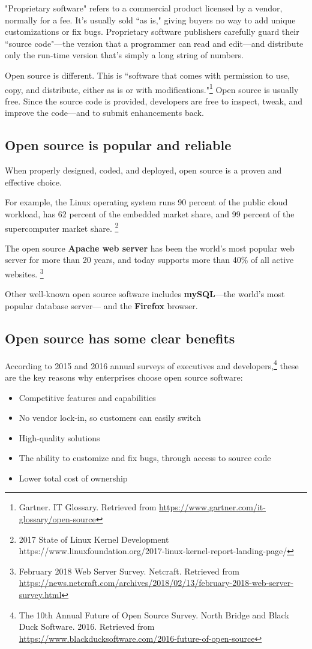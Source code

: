 "Proprietary software" refers to a commercial product licensed by a vendor, normally for a fee. It's usually sold ``as is," giving buyers no way to add unique customizations or fix bugs. Proprietary software publishers carefully guard their ``source code"---the version that a programmer can read and edit---and distribute only the run-time version that's simply a long string of numbers. 

Open source is different. This is ``software that comes with permission to use, copy, and distribute, either as is or with modifications."\footnote{ Gartner. IT Glossary. Retrieved from \url{https://www.gartner.com/it-glossary/open-source}} Open source is usually free. Since the source code is  provided, developers are free to inspect, tweak, and improve the code---and to submit enhancements back. 

\subsection{Open source is popular and reliable}
When properly designed, coded, and deployed, open source is a proven and effective choice. 

For example, the Linux operating system runs 90 percent of the public cloud workload, has 62 percent of the embedded market share, and 99 percent of the supercomputer market share. \footnote{ 2017 State of Linux Kernel Development {https://www.linuxfoundation.org/2017-linux-kernel-report-landing-page/}}

The open source \textbf{Apache web server} has been the world's most popular web server for more than 20 years, and today supports more than 40\% of all active websites. \footnote{ February 2018 Web Server Survey. Netcraft. Retrieved from \url{https://news.netcraft.com/archives/2018/02/13/february-2018-web-server-survey.html}}

Other well-known open source software includes \textbf{mySQL}---the world's most popular database server--- and the \textbf{Firefox} browser. 

\subsection{Open source has some clear benefits}
According to 2015 and 2016 annual surveys of executives and developers,\footnote{ The 10th Annual Future of Open Source Survey. North Bridge and Black Duck Software. 2016. Retrieved from \url{https://www.blackducksoftware.com/2016-future-of-open-source}} these are the key reasons why enterprises choose open source software:  
\begin{itemize}
\item Competitive features and capabilities
\item No vendor lock-in, so customers can easily switch
\item High-quality solutions
\item The ability to customize and fix bugs, through access to source code
\item Lower total cost of ownership
\end{itemize}

